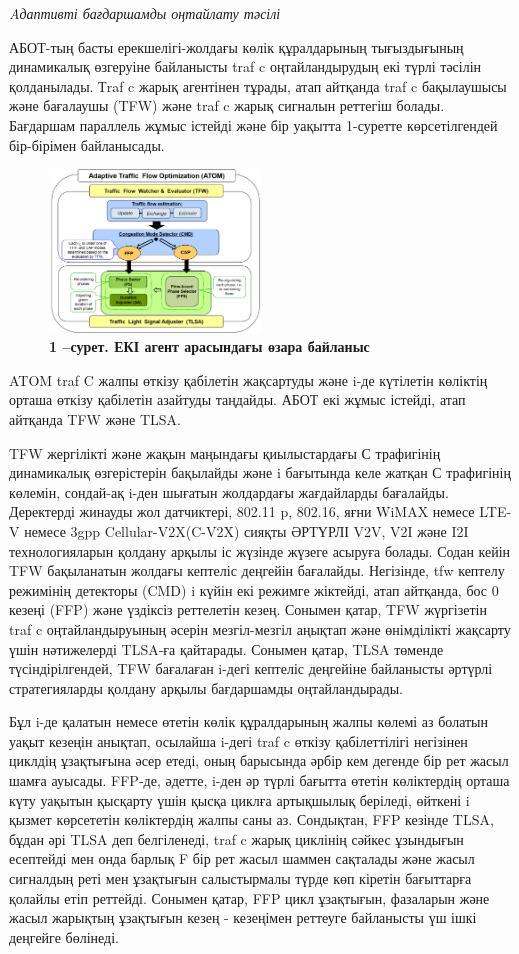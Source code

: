 \emph{Aдаптивті бағдаршамды оңтайлату тәсілі}

АБОТ-тың басты ерекшелігі-жолдағы көлік құралдарының тығыздығының
динамикалық өзгеруіне байланысты traf c оңтайландырудың екі түрлі
тәсілін қолданылады. Тraf c жарық агентінен тұрады, атап айтқанда traf c
бақылаушысы және бағалаушы (TFW) және traf c жарық сигналын реттегіш
болады. Бағдаршам параллель жұмыс істейді және бір уақытта 1-суретте
көрсетілгендей бір-бірімен байланысады.

\begin{figure}[H]
	\centering
	\includegraphics[width=0.5\textwidth]{assets/158}
	\caption*{\bfseries 1 --сурет. ЕКІ агент арасындағы өзара байланыс}
\end{figure}


ATOM traf C жалпы өткізу қабілетін жақсартуды және i-де күтілетін
көліктің орташа өткізу қабілетін азайтуды таңдайды. АБОТ екі жұмыс
істейді, атап айтқанда TFW және TLSA.

TFW жергілікті және жақын маңындағы қиылыстардағы С трафигінің
динамикалық өзгерістерін бақылайды және i бағытында келе жатқан С
трафигінің көлемін, сондай-ақ i-ден шығатын жолдардағы жағдайларды
бағалайды. Деректерді жинауды жол датчиктері, 802.11 p, 802.16, яғни
WiMAX немесе LTE-V немесе 3gpp Cellular-V2X(C-V2X) сияқты ӘРТҮРЛІ V2V,
V2I және I2I технологияларын қолдану арқылы іс жүзінде жүзеге асыруға
болады. Содан кейін TFW бақыланатын жолдағы кептеліс деңгейін бағалайды.
Негізінде, tfw кептелу режимінің детекторы (CMD) i күйін екі режимге
жіктейді, атап айтқанда, бос 0 кезеңі (FFP) және үздіксіз реттелетін
кезең. Сонымен қатар, TFW жүргізетін traf c оңтайландыруының әсерін
мезгіл-мезгіл аңықтап және өнімділікті жақсарту үшін нәтижелерді TLSA-ға
қайтарады. Сонымен қатар, TLSA төменде түсіндірілгендей, TFW бағалаған
i-дегі кептеліс деңгейіне байланысты әртүрлі стратегияларды қолдану
арқылы бағдаршамды оңтайландырады.

Бұл i-де қалатын немесе өтетін көлік құралдарының жалпы көлемі аз
болатын уақыт кезеңін анықтап, осылайша i-дегі traf c өткізу
қабілеттілігі негізінен циклдің ұзақтығына әсер етеді, оның барысында
әрбір кем дегенде бір рет жасыл шамға ауысады. FFP-де, әдетте, i-ден әр
түрлі бағытта өтетін көліктердің орташа күту уақытын қысқарту үшін қысқа
циклға артықшылық беріледі, өйткені i қызмет көрсететін көліктердің
жалпы саны аз. Сондықтан, FFP кезінде TLSA, бұдан әрі TLSA деп
белгіленеді, traf c жарық циклінің сәйкес ұзындығын есептейді мен онда
барлық F бір рет жасыл шаммен сақталады және жасыл сигналдың реті мен
ұзақтығын салыстырмалы түрде көп кіретін бағыттарға қолайлы етіп
реттейді. Сонымен қатар, FFP цикл ұзақтығын, фазаларын және жасыл
жарықтың ұзақтығын кезең - кезеңімен реттеуге байланысты үш ішкі
деңгейге бөлінеді.

